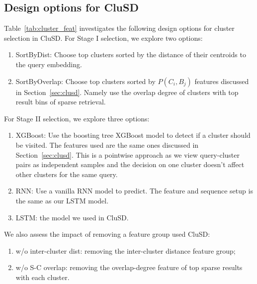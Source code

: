 \subsection{Design options for CluSD}
\label{sect:evalLSTM}

Table~\ref{tab:cluster_feat} investigates the following design options 
for cluster selection in CluSD. 
For Stage I selection, we explore two options:
\begin{enumerate}
    \item SortByDist: Choose top clusters sorted by the distance of their  centroids to  the  query embedding.
    \item SortByOverlap:  Choose top  clusters sorted  by $P(C_i, B_j)$ features discussed in Section~\ref{sec:clusd}.
Namely use the overlap degree of clusters with top result bins of sparse retrieval. 
\end{enumerate}
For Stage II selection, we explore three options:
 \begin{enumerate}
    \item XGBoost: Use the boosting tree XGBoost model to detect if a cluster should be visited.
The features used are the same ones discussed in Section~\ref{sec:clusd}. This is a pointwise approach as we view query-cluster pairs as independent samples and the decision on one cluster doesn't affect other clusters for the same query.
    \item RNN: Use a vanilla RNN model to predict. The feature and sequence setup is the same as our LSTM model. 
    \item LSTM: the model we used in CluSD.
\end{enumerate}
    We also assess  the impact  of removing a  feature group  used CluSD:
\begin{enumerate}
\item w/o inter-cluster dist: removing  the inter-cluster distance feature group;
\item w/o S-C overlap: removing  the overlap-degree feature of top sparse results with each cluster.
\end{enumerate}


